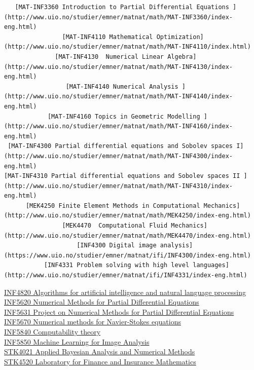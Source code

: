 \documentclass[]{article}
\begin{document}
\begin{verbatim}
   [MAT-INF3360 Introduction to Partial Differential Equations ](http://www.uio.no/studier/emner/matnat/math/MAT-INF3360/index-eng.html)          
                [MAT-INF4110 Mathematical Optimization](http://www.uio.no/studier/emner/matnat/math/MAT-INF4110/index.html)                       
              [MAT-INF4130  Numerical Linear Algebra](http://www.uio.no/studier/emner/matnat/math/MAT-INF4130/index-eng.html)                     
                 [MAT-INF4140 Numerical Analysis ](http://www.uio.no/studier/emner/matnat/math/MAT-INF4140/index-eng.html)                        
            [MAT-INF4160 Topics in Geometric Modelling ](http://www.uio.no/studier/emner/matnat/math/MAT-INF4160/index-eng.html)                  
 [MAT-INF4300 Partial differential equations and Sobolev spaces I](http://www.uio.no/studier/emner/matnat/math/MAT-INF4300/index-eng.html)        
[MAT-INF4310 Partial differential equations and Sobolev spaces II ](http://www.uio.no/studier/emner/matnat/math/MAT-INF4310/index-eng.html)       
      [MEK4250 Finite Element Methods in Computational Mechanics](http://www.uio.no/studier/emner/matnat/math/MEK4250/index-eng.html)             
                [MEK4470  Computational Fluid Mechanics](http://www.uio.no/studier/emner/matnat/math/MEK4470/index-eng.html)                      
                    [INF4300 Digital image analysis](https://www.uio.no/studier/emner/matnat/ifi/INF4300/index-eng.html)                          
           [INF4331 Problem solving with high level languages](http://www.uio.no/studier/emner/matnat/ifi/INF4331/index-eng.html)                 
\end{verbatim}

\href{https://www.uio.no/studier/emner/matnat/ifi/INF4820/index-eng.html}{INF4820
Algorithms for artificial intelligence and natural language
processing}\\
\href{http://www.uio.no/studier/emner/matnat/ifi/INF5620/index-eng.html}{INF5620
Numerical Methods for Partial Differential Equations}\\
\href{http://www.uio.no/studier/emner/matnat/ifi/INF5631/index-eng.html}{INF5631
Project on Numerical Methods for Partial Differential Equations}\\
\href{http://www.uio.no/studier/emner/matnat/ifi/INF5670/}{INF5670
Numerical methods for Navier-Stokes equations}\\
\href{https://www.uio.no/studier/emner/matnat/ifi/INF5840/index-eng.html}{INF5840
Computability theory}\\
\href{http://www.uio.no/studier/emner/matnat/ifi/INF5860/index-eng.html}{INF5850
Machine Learning for Image Analysis}\\
\href{http://www.uio.no/studier/emner/matnat/math/STK4021/index-eng.html}{STK4021
Applied Bayesian Analysis and Numerical Methods}\\
\href{http://www.uio.no/studier/emner/matnat/math/STK4520/index-eng.html}{STK4520
Laboratory for Finance and Insurance Mathematics}
\end{document}
